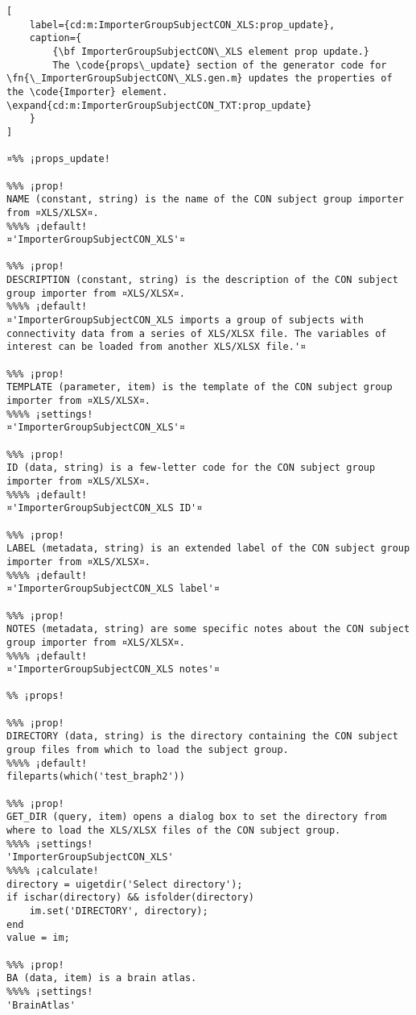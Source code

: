 \documentclass{tufte-handout}
\begin{document}
\begin{lstlisting}[
	label={cd:m:ImporterGroupSubjectCON_XLS:prop_update},
	caption={
		{\bf ImporterGroupSubjectCON\_XLS element prop update.}
		The \code{props\_update} section of the generator code for \fn{\_ImporterGroupSubjectCON\_XLS.gen.m} updates the properties of the \code{Importer} element. \expand{cd:m:ImporterGroupSubjectCON_TXT:prop_update}
	}
]

¤%% ¡props_update!

%%% ¡prop!
NAME (constant, string) is the name of the CON subject group importer from ¤XLS/XLSX¤.
%%%% ¡default!
¤'ImporterGroupSubjectCON_XLS'¤

%%% ¡prop!
DESCRIPTION (constant, string) is the description of the CON subject group importer from ¤XLS/XLSX¤.
%%%% ¡default!
¤'ImporterGroupSubjectCON_XLS imports a group of subjects with connectivity data from a series of XLS/XLSX file. The variables of interest can be loaded from another XLS/XLSX file.'¤

%%% ¡prop!
TEMPLATE (parameter, item) is the template of the CON subject group importer from ¤XLS/XLSX¤.
%%%% ¡settings!
¤'ImporterGroupSubjectCON_XLS'¤

%%% ¡prop!
ID (data, string) is a few-letter code for the CON subject group importer from ¤XLS/XLSX¤.
%%%% ¡default!
¤'ImporterGroupSubjectCON_XLS ID'¤

%%% ¡prop!
LABEL (metadata, string) is an extended label of the CON subject group importer from ¤XLS/XLSX¤.
%%%% ¡default!
¤'ImporterGroupSubjectCON_XLS label'¤

%%% ¡prop!
NOTES (metadata, string) are some specific notes about the CON subject group importer from ¤XLS/XLSX¤.
%%%% ¡default!
¤'ImporterGroupSubjectCON_XLS notes'¤

%% ¡props!

%%% ¡prop!
DIRECTORY (data, string) is the directory containing the CON subject group files from which to load the subject group.
%%%% ¡default!
fileparts(which('test_braph2'))

%%% ¡prop!
GET_DIR (query, item) opens a dialog box to set the directory from where to load the XLS/XLSX files of the CON subject group.
%%%% ¡settings!
'ImporterGroupSubjectCON_XLS'
%%%% ¡calculate!
directory = uigetdir('Select directory');
if ischar(directory) && isfolder(directory)
    im.set('DIRECTORY', directory);
end
value = im;

%%% ¡prop!
BA (data, item) is a brain atlas.
%%%% ¡settings!
'BrainAtlas'


\end{lstlisting}
\end{document}
